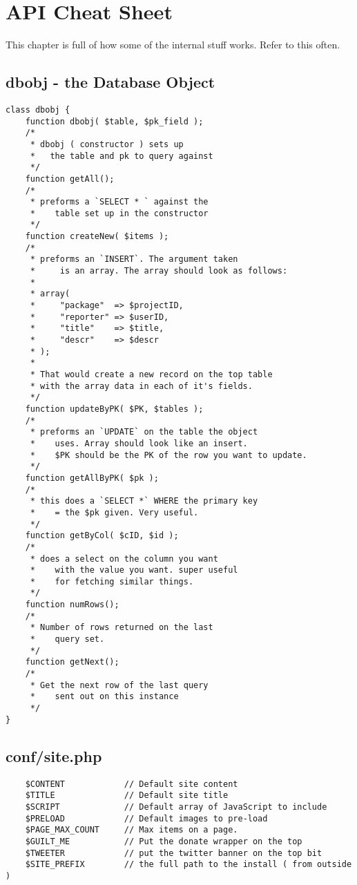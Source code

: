 \chapter{API Cheat Sheet}
This chapter is full of how some of the internal
stuff works. Refer to this often.
\section{dbobj - the Database Object}
\begin{verbatim}
class dbobj {
    function dbobj( $table, $pk_field );
    /*
     * dbobj ( constructor ) sets up
     *   the table and pk to query against
     */
    function getAll();
    /*
     * preforms a `SELECT * ` against the
     *    table set up in the constructor
     */
    function createNew( $items );
    /*
     * preforms an `INSERT`. The argument taken
     *     is an array. The array should look as follows:
     *
     * array(
     *     "package"  => $projectID,
     *     "reporter" => $userID,
     *     "title"    => $title,
     *     "descr"    => $descr
     * );
     *
     * That would create a new record on the top table
     * with the array data in each of it's fields.
     */
    function updateByPK( $PK, $tables );
    /*
     * preforms an `UPDATE` on the table the object
     *    uses. Array should look like an insert.
     *    $PK should be the PK of the row you want to update.
     */
    function getAllByPK( $pk );
    /*
     * this does a `SELECT *` WHERE the primary key
     *    = the $pk given. Very useful.
     */
    function getByCol( $cID, $id );
    /*
     * does a select on the column you want
     *    with the value you want. super useful
     *    for fetching similar things.
     */
    function numRows();
    /*
     * Number of rows returned on the last
     *    query set.
     */
    function getNext();
    /*
     * Get the next row of the last query
     *    sent out on this instance
     */
}
\end{verbatim}
\section{conf/site.php}
\begin{verbatim}
    $CONTENT            // Default site content
    $TITLE              // Default site title
    $SCRIPT             // Default array of JavaScript to include
    $PRELOAD            // Default images to pre-load
    $PAGE_MAX_COUNT     // Max items on a page. 
    $GUILT_ME           // Put the donate wrapper on the top
    $TWEETER            // put the twitter banner on the top bit
    $SITE_PREFIX        // the full path to the install ( from outside ) 
\end{verbatim}
